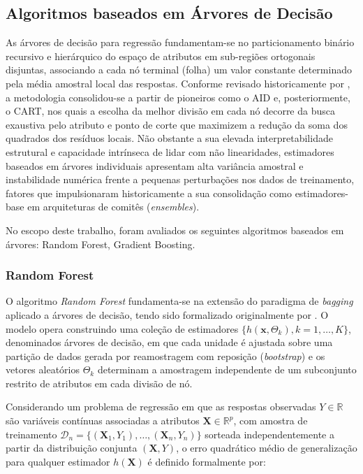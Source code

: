 \subsection{Algoritmos baseados em Árvores de Decisão}

As árvores de decisão para regressão fundamentam-se no particionamento binário recursivo e hierárquico do espaço de atributos em sub-regiões ortogonais disjuntas, associando a cada nó terminal (folha) um valor constante determinado pela média amostral local das respostas. Conforme revisado historicamente por , a metodologia consolidou-se a partir de pioneiros como o \gls{AID} e, posteriormente, o \gls{CART}, nos quais a escolha da melhor divisão em cada nó decorre da busca exaustiva pelo atributo e ponto de corte que maximizem a redução da soma dos quadrados dos resíduos locais. Não obstante a sua elevada interpretabilidade estrutural e capacidade intrínseca de lidar com não linearidades, estimadores baseados em árvores individuais apresentam alta variância amostral e instabilidade numérica frente a pequenas perturbações nos dados de treinamento, fatores que impulsionaram historicamente a sua consolidação como estimadores-base em arquiteturas de comitês (\textit{ensembles}).

No escopo deste trabalho, foram avaliados os seguintes algoritmos baseados em árvores: Random Forest, Gradient Boosting.

\subsubsection{Random Forest}

O algoritmo \textit{Random Forest} fundamenta-se na extensão do paradigma de \textit{bagging} aplicado a árvores de decisão, tendo sido formalizado originalmente por . O modelo opera construindo uma coleção de estimadores $\{h(\mathbf{x}, \Theta_k), k = 1, \dots, K\}$, denominados árvores de decisão, em que cada unidade é ajustada sobre uma partição de dados gerada por reamostragem com reposição (\textit{bootstrap}) e os vetores aleatórios $\Theta_k$ determinam a amostragem independente de um subconjunto restrito de atributos em cada divisão de nó.

Considerando um problema de regressão em que as respostas observadas $Y \in \mathbb{R}$ são variáveis contínuas associadas a atributos $\mathbf{X} \in \mathbb{R}^p$, com amostra de treinamento $\mathcal{D}_n = \{(\mathbf{X}_1, Y_1), \dots, (\mathbf{X}_n, Y_n)\}$ sorteada independentemente a partir da distribuição conjunta $(\mathbf{X}, Y)$, o erro quadrático médio de generalização para qualquer estimador $h(\mathbf{X})$ é definido formalmente por:

